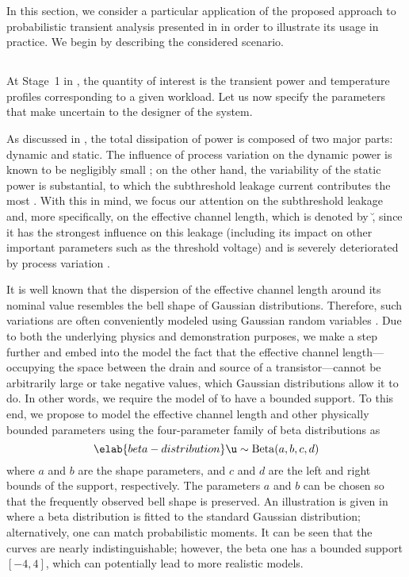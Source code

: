 In this section, we consider a particular application of the proposed approach
to probabilistic transient analysis presented in 
in order to illustrate its usage in practice. We begin by describing the
considered scenario.

\subsection{\problemtitle}

At Stage~1 in , the quantity of interest \g is the
transient power and temperature profiles corresponding to a given workload. Let
us now specify the parameters \vu that make \g uncertain to the designer of the
system.

As discussed in , the total dissipation of power is composed
of two major parts: dynamic and static. The influence of process variation on
the dynamic power is known to be negligibly small \cite{srivastava2010}; on the
other hand, the variability of the static power is substantial, to which the
subthreshold leakage current contributes the most \cite{juan2011, juan2012}.
With this in mind, we focus our attention on the subthreshold leakage and, more
specifically, on the effective channel length, which is denoted by \u, since it
has the strongest influence on this leakage (including its impact on other
important parameters such as the threshold voltage) and is severely deteriorated
by process variation \cite{chandrakasan2000}.

It is well known that the dispersion of the effective channel length around its
nominal value resembles the bell shape of Gaussian distributions. Therefore,
such variations are often conveniently modeled using Gaussian random variables
\cite{bhardwaj2006, ghanta2006, huang2009a, shen2009, chandra2010,
srivastava2010, juan2011, juan2012, lee2013}. Due to both the underlying physics
and demonstration purposes, we make a step further and embed into the model the
fact that the effective channel length---occupying the space between the drain
and source of a transistor---cannot be arbitrarily large or take negative
values, which Gaussian distributions allow it to do. In other words, we require
the model of \u to have a bounded support. To this end, we propose to model the
effective channel length and other physically bounded parameters using the
four-parameter family of beta distributions as
\begin{equation} \elab{beta-distribution}
  \u \sim \mathrm{Beta}(a, b, c, d)
\end{equation}
where $a$ and $b$ are the shape parameters, and $c$ and $d$ are the left and
right bounds of the support, respectively. The parameters $a$ and $b$ can be
chosen so that the frequently observed bell shape is preserved. An illustration
is given in  where a beta distribution is fitted to
the standard Gaussian distribution; alternatively, one can match probabilistic
moments. It can be seen that the curves are nearly indistinguishable; however,
the beta one has a bounded support $[-4, 4]$, which can potentially lead to more
realistic models.

